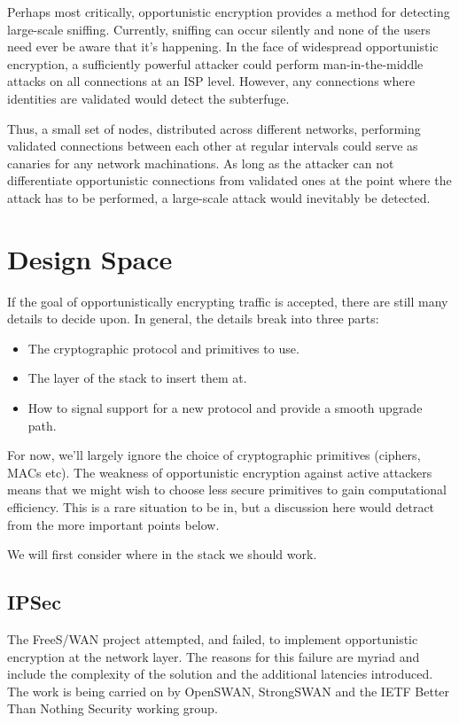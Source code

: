 \documentclass[conference]{IEEEtran}
\begin{document}
Perhaps most critically, opportunistic encryption provides a method for
detecting large-scale sniffing. Currently, sniffing can occur silently and none
of the users need ever be aware that it's happening. In the face of widespread
opportunistic encryption, a sufficiently powerful attacker could perform
man-in-the-middle attacks on all connections at an ISP level. However, any
connections where identities are validated would detect the subterfuge.

Thus, a small set of nodes, distributed across different networks, performing
validated connections between each other at regular intervals could serve as
canaries for any network machinations. As long as the attacker can not
differentiate opportunistic connections from validated ones at the point where
the attack has to be performed, a large-scale attack would inevitably be
detected.

\section{Design Space}

If the goal of opportunistically encrypting traffic is accepted, there are
still many details to decide upon. In general, the details break into three
parts:

\begin{itemize}
\item The cryptographic protocol and primitives to use.
\item The layer of the stack to insert them at.
\item How to signal support for a new protocol and provide a smooth upgrade path.
\end{itemize}

For now, we'll largely ignore the choice of cryptographic primitives (ciphers,
MACs etc). The weakness of opportunistic encryption against active attackers
means that we might wish to choose less secure primitives to gain computational
efficiency. This is a rare situation to be in, but a discussion here would
detract from the more important points below.

We will first consider where in the stack we should work.

\subsection{IPSec}

The FreeS/WAN project\cite{freeswan} attempted, and
failed\cite{freeswanfailure}, to implement
opportunistic encryption at the network layer. The reasons for this failure are
myriad and include the complexity of the solution and the additional latencies
introduced. The work is being carried on by OpenSWAN, StrongSWAN and the IETF
Better Than Nothing Security working group\cite{btns}.
\end{document}
